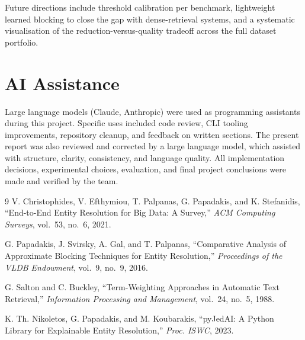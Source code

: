 \documentclass[10pt,twocolumn]{article}
\begin{document}
Future directions include threshold calibration per benchmark, lightweight
learned blocking to close the gap with dense-retrieval systems, and a
systematic visualisation of the reduction-versus-quality tradeoff across
the full dataset portfolio.

\section*{AI Assistance}
Large language models (Claude, Anthropic) were used as programming assistants
during this project. Specific uses included code review, CLI tooling
improvements, repository cleanup, and feedback on written sections.
The present report was also reviewed and corrected by a large language model,
which assisted with structure, clarity, consistency, and language quality.
All implementation decisions, experimental choices, evaluation, and final
project conclusions were made and verified by the team.

\begin{thebibliography}{9}
V. Christophides, V. Efthymiou, T. Palpanas, G. Papadakis, and K. Stefanidis,
``End-to-End Entity Resolution for Big Data: A Survey,''
\emph{ACM Computing Surveys}, vol.~53, no.~6, 2021.

G. Papadakis, J. Svirsky, A. Gal, and T. Palpanas,
``Comparative Analysis of Approximate Blocking Techniques for Entity
Resolution,''
\emph{Proceedings of the VLDB Endowment}, vol.~9, no.~9, 2016.

G. Salton and C. Buckley,
``Term-Weighting Approaches in Automatic Text Retrieval,''
\emph{Information Processing and Management}, vol.~24, no.~5, 1988.

K. Th. Nikoletos, G. Papadakis, and M. Koubarakis,
``pyJedAI: A Python Library for Explainable Entity Resolution,''
\emph{Proc. ISWC}, 2023.
\end{thebibliography}
\end{document}
